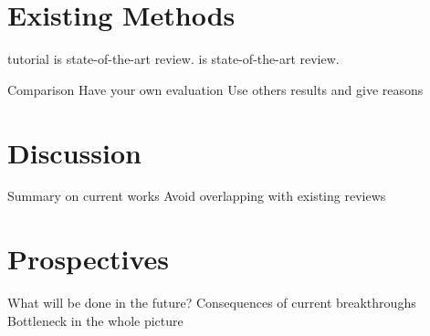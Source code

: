 \documentclass[12pt,conference,compsocconf]{../IEEEtran}
\begin{document}
\section{Existing Methods}

\citep{1078}
\citep{1079}
\citep{1080}
\citep{1103} tutorial
\citep{1081} is state-of-the-art review.
\citep{1082} is state-of-the-art review.

Comparison
Have your own evaluation
Use others results and give reasons

\section{Discussion}

Summary on current works
  Avoid overlapping with existing reviews

\section{Prospectives}

What will be done in the future?
  Consequences of current breakthroughs
  Bottleneck in the whole picture



\end{document}

